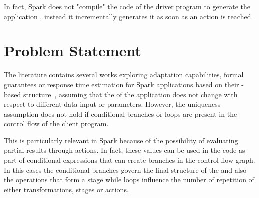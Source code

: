 In fact, Spark does not "compile" the code of the driver program to generate the application \plan, instead it incrementally generates it as soon as an action is reached.

\section{Problem Statement}\label{sec:problem_statement}

The literature contains several works exploring adaptation capabilities, formal guarantees or response time estimation for Spark applications based on their \plan-based structure~\cite{dSpark, xsparkreport, Quattrocchi2018}, assuming that the \plan of the application does not change with respect to different data input or parameters. However, the \plan uniqueness assumption does not hold if conditional branches or loops are present in the control flow of the client program.

This is particularly relevant in Spark because of the possibility of evaluating
partial results through actions. In fact, these values can be used in the code as part of conditional expressions that can create branches in the control flow graph. In this cases the conditional branches govern the final structure of the \plan and also the operations that form a stage while loops influence the number of repetition of either transformations, stages or actions. 


